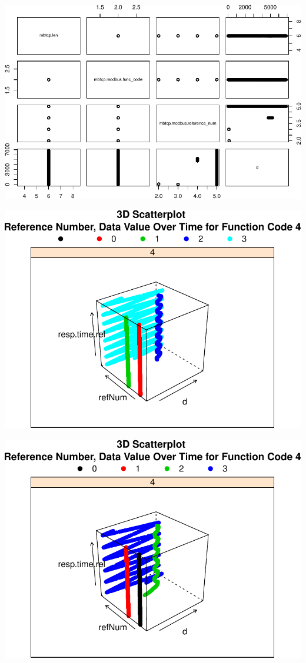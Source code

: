 \documentclass[]{article}
\begin{document}
\pagebreak

\includegraphics{modbus_files/figure-latex/unnamed-chunk-23-1.pdf}

\includegraphics{modbus_files/figure-latex/unnamed-chunk-24-1.pdf}

\includegraphics{modbus_files/figure-latex/unnamed-chunk-25-1.pdf}
\end{document}
